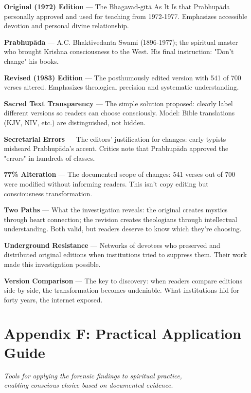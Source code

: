 \documentclass[11pt,twoside]{book}
\begin{document}
\textbf{\textbf{Original (1972) Edition}} — The Bhagavad-gītā As It Is that Prabhupāda personally approved and used for teaching from 1972-1977. Emphasizes accessible devotion and personal divine relationship.

\textbf{\textbf{Prabhupāda}} — A.C. Bhaktivedanta Swami (1896-1977); the spiritual master who brought Krishna consciousness to the West. His final instruction: "Don't change" his books.

\textbf{\textbf{Revised (1983) Edition}} — The posthumously edited version with 541 of 700 verses altered. Emphasizes theological precision and systematic understanding.

\textbf{\textbf{Sacred Text Transparency}} — The simple solution proposed: clearly label different versions so readers can choose consciously. Model: Bible translations (KJV, NIV, etc.) are distinguished, not hidden.

\textbf{\textbf{Secretarial Errors}} — The editors' justification for changes: early typists misheard Prabhupāda's accent. Critics note that Prabhupāda approved the "errors" in hundreds of classes.

\textbf{\textbf{77\% Alteration}} — The documented scope of changes: 541 verses out of 700 were modified without informing readers. This isn't copy editing but consciousness transformation.

\textbf{\textbf{Two Paths}} — What the investigation reveals: the original creates mystics through heart connection; the revision creates theologians through intellectual understanding. Both valid, but readers deserve to know which they're choosing.

\textbf{\textbf{Underground Resistance}} — Networks of devotees who preserved and distributed original editions when institutions tried to suppress them. Their work made this investigation possible.

\textbf{\textbf{Version Comparison}} — The key to discovery: when readers compare editions side-by-side, the transformation becomes undeniable. What institutions hid for forty years, the internet exposed.
\part*{Appendix F: Practical Application Guide}
\label{sec:org24a2218}
\thispagestyle{plain}

{\centering\itshape Tools for applying the forensic findings to spiritual practice,\\enabling conscious choice based on documented evidence.\par}
\vspace{0.3cm}
\end{document}
